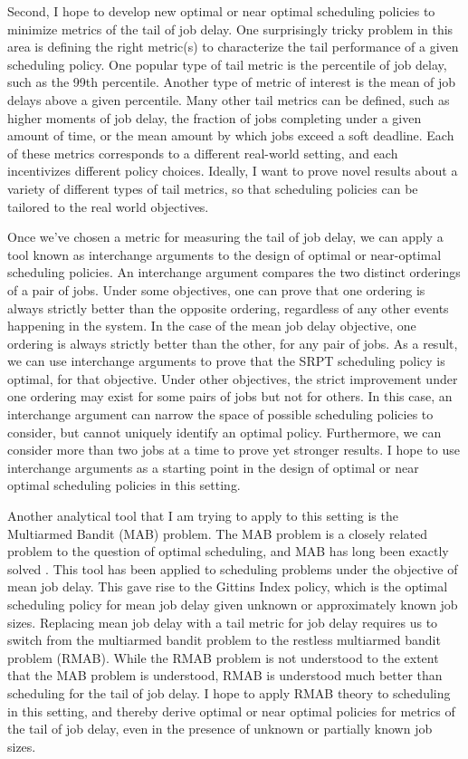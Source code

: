 \documentclass[11pt]{article}
\begin{document}
Second, I hope to develop new optimal or near optimal scheduling policies
to minimize metrics of the tail of job delay.
One surprisingly tricky problem in this area is defining the right metric(s)
to characterize the tail performance of a given scheduling policy.
One popular type of tail metric is the percentile of job delay,
such as the 99th percentile.
Another type of metric of interest is the mean of job delays above a given percentile.
Many other tail metrics can be defined,
such as higher moments of job delay,
the fraction of jobs completing under a given amount of time,
or the mean amount by which jobs exceed a soft deadline.
Each of these metrics corresponds to a different real-world setting,
and each incentivizes different policy choices.
Ideally, I want to prove novel results about a variety of different types of tail metrics,
so that scheduling policies can be tailored to the real world objectives.

Once we’ve chosen a metric for measuring the tail of job delay,
we can apply a tool known as interchange arguments
to the design of optimal or near-optimal scheduling policies.
An interchange argument compares the two distinct orderings of a pair of jobs.
Under some objectives,
one can prove that one ordering is always strictly better than the opposite ordering,
regardless of any other events happening in the system.
In the case of the mean job delay objective,
one ordering is always strictly better than the other,
for any pair of jobs.
As a result, we can use interchange arguments to prove that the SRPT scheduling policy is optimal,
for that objective.
Under other objectives,
the strict improvement under one ordering may exist for some pairs of jobs but not for others.
In this case, an interchange argument can narrow
the space of possible scheduling policies to consider,
but cannot uniquely identify an optimal policy.
Furthermore, we can consider more than two jobs at a time to prove yet stronger results.
I hope to use interchange arguments as a starting point in the design of
optimal or near optimal scheduling policies in this setting.

Another analytical tool that I am trying to apply to this setting
is the Multiarmed Bandit (MAB) problem.
The MAB problem is a closely related problem to the question of optimal scheduling,
and MAB has long been exactly solved \cite{doi:10.1111/j.2517-6161.1979.tb01068.x}.
This tool has been applied to scheduling problems under the objective of mean job delay.
This gave rise to the Gittins Index policy,
which is the optimal scheduling policy for mean job delay
given unknown or approximately known job sizes.
Replacing mean job delay with a tail metric for job delay
requires us to switch from the multiarmed bandit problem
to the restless multiarmed bandit problem (RMAB).
While the RMAB problem is not understood to the extent that the MAB problem is understood,
RMAB is understood much better than scheduling for the tail of job delay.
I hope to apply RMAB theory to scheduling in this setting,
and thereby derive optimal or near optimal policies for metrics of the tail of job delay,
even in the presence of unknown or partially known job sizes.
\end{document}
